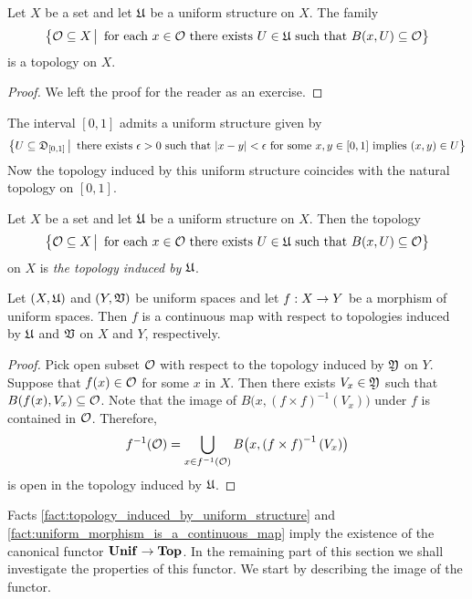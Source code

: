 \begin{fact}\label{fact:topology_induced_by_uniform_structure}
Let $X$ be a set and let ${\mathfrak U}$ be a uniform structure on $X$. The family
$$\big\{{\mathcal O}\subseteq X\,\big|\,\mbox{ for each }x\in {\mathcal O}\mbox{ there exists }U\in {\mathfrak U}\mbox{ such that }B(x,U)\subseteq {\mathcal O}\big\}$$
is a topology on $X$.
\end{fact}
\begin{proof}
We left the proof for the reader as an exercise.
\end{proof}

\begin{example}\label{example:uniform_structure_on_interval}
The interval $[0,1]$ admits a uniform structure given by
$$\big\{U\subseteq {\mathfrak D}_{[0,1]}\,\big|\,\mbox{ there exists }\epsilon > 0\mbox{ such that }|x - y|<\epsilon\mbox{ for some }x,y\in [0,1]\mbox{ implies }(x,y)\in U\big\}$$
Now the topology induced by this uniform structure coincides with the natural topology on $[0,1]$.
\end{example}

\begin{definition}
Let $X$ be a set and let ${\mathfrak U}$ be a uniform structure on $X$. Then the topology
$$\big\{{\mathcal O} \subseteq X\,\big|\,\mbox{ for each }x\in {\mathcal O}\mbox{ there exists }U\in {\mathfrak U}\mbox{ such that }B(x,U)\subseteq {\mathcal O}\big\}$$
on $X$ is \textit{the topology induced by ${\mathfrak U}$}.
\end{definition}

\begin{fact}\label{fact:uniform_morphism_is_a_continuous_map}
Let $(X,{\mathfrak U})$ and $(Y,{\mathfrak V})$ be uniform spaces and let $f:X\rightarrow Y$ be a morphism of uniform spaces. Then $f$ is a continuous map with respect to topologies induced by ${\mathfrak U}$ and ${\mathfrak V}$ on $X$ and $Y$, respectively.
\end{fact}
\begin{proof}
Pick open subset ${\mathcal O}$ with respect to the topology induced by ${\mathfrak Y}$ on $Y$. Suppose that $f(x) \in {\mathcal O}$ for some $x$ in $X$. Then there exists $V_x \in {\mathfrak Y}$ such that $B(f(x),V_x)\subseteq {\mathcal O}$. Note that the image of $B\big(x,\left(f\times f\right)^{-1}(V_x)\big)$ under $f$ is contained in ${\mathcal O}$. Therefore,
$$f^{-1}({\mathcal O}) = \bigcup_{x\in f^{-1}({\mathcal O})}B\big(x,\left(f\times f\right)^{-1}(V_x)\big)$$
is open in the topology induced by ${\mathfrak U}$.
\end{proof}
\noindent
Facts \ref{fact:topology_induced_by_uniform_structure} and \ref{fact:uniform_morphism_is_a_continuous_map} imply the existence of the canonical functor $\mathbf{Unif} \rightarrow \mathbf{Top}$. In the remaining part of this section we shall investigate the properties of this functor. We start by describing the image of the functor.

